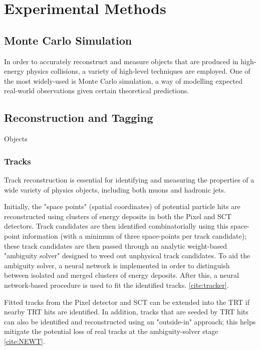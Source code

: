 \section{Experimental Methods} \label{sec:methods} 

\subsection{Monte Carlo Simulation} \label{sec:MC} 
In order to accurately reconstruct and measure objects that are produced in high-energy physics collisions, a variety of high-level techniques are employed. One of the most widely-used is Monte Carlo simulation, a way of modelling expected real-world observations given certain theoretical predictions. 



\subsection{Reconstruction and Tagging} \label{sec:Reco} 

Objects 


\subsubsection{Tracks} \label{sec:Tracks} 

Track reconstruction is essential for identifying and measuring the properties of a wide variety of physics objects, including both muons and hadronic jets.

Initially, the "space points" (spatial coordinates) of potential particle hits are reconstructed using clusters of energy deposits in both the Pixel and SCT detectors. Track candidates are then identified combinatorially using this space-point information (with a minimum of three space-points per track candidate); these track candidates are then passed through an analytic weight-based "ambiguity solver" designed to weed out unphysical track candidates. To aid the ambiguity solver, a neural network is implemented in order to distinguish between isolated and merged clusters of energy deposits. After this, a neural network-based procedure is used to fit the identified tracks. \ref{cite:tracker}.

Fitted tracks from the Pixel detector and SCT can be extended into the TRT if nearby TRT hits are identified. In addition, tracks that are seeded by TRT hits can also be identified and reconstructed using an "outside-in" approach; this helps mitigate the potential loss of real tracks at the ambiguity-solver stage \ref{cite:NEWT}.

